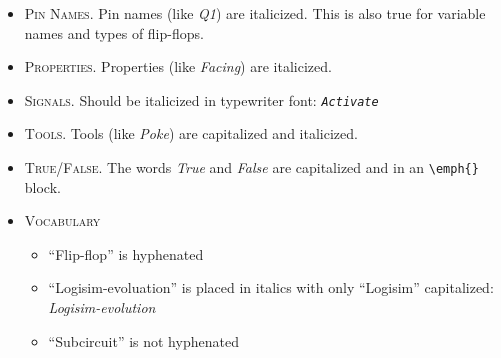 \begin{itemize}
  \item \textsc{Pin Names}. Pin names (like \textit{Q1}) are italicized. This is also true for variable names and types of flip-flops.

  \item \textsc{Properties}. Properties (like \textit{Facing}) are italicized.

	\item \textsc{Signals}. Should be italicized in typewriter font: \textit{\texttt{Activate}}

  \item \textsc{Tools}. Tools (like \textit{Poke}) are capitalized and italicized.

  \item \textsc{True/False}. The words \emph{True} and \emph{False} are capitalized and in an \lstinline[columns=fixed]|\emph{}| block.

	\item \textsc{Vocabulary}
	
  \begin{itemize}
	\item ``Flip-flop'' is hyphenated
	\item ``Logisim-evoluation'' is placed in italics with only ``Logisim'' capitalized: \textit{Logisim-evolution}
	\item ``Subcircuit'' is not hyphenated
\end{itemize}	

\end{itemize}

